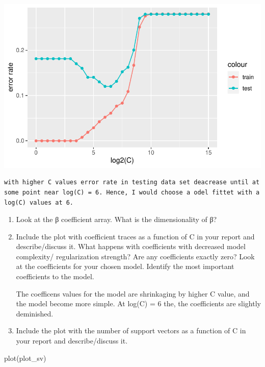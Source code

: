 \documentclass[
  letterpaper,
  DIV=11,
  numbers=noendperiod]{scrartcl}
\newenvironment{Shaded}{\begin{snugshade}}{\end{snugshade}}
\newcommand{\FunctionTok}[1]{\textcolor[rgb]{0.28,0.35,0.67}{#1}}
\newcommand{\NormalTok}[1]{\textcolor[rgb]{0.00,0.23,0.31}{#1}}
\begin{document}
\includegraphics{excercise_doc_files/figure-pdf/unnamed-chunk-28-1.pdf}

\begin{verbatim}
with higher C values error rate in testing data set deacrease until at some point near log(C) = 6. Hence, I would choose a odel fittet with a log(C) values at 6.
\end{verbatim}

\begin{enumerate}
\def\labelenumi{(\alph{enumi})}
\setcounter{enumi}{6}
\item
  Look at the β coefficient array. What is the dimensionality of β?
\item
  Include the plot with coefficient traces as a function of C in your
  report and describe/discuss it. What happens with coefficients with
  decreased model complexity/ regularization strength? Are any
  coefficients exactly zero? Look at the coefficients for your chosen
  model. Identify the most important coefficients to the model.

  The coefficens values for the model are shrinkaging by higher C value,
  and the model become more simple. At log(C) = 6 the, the coefficients
  are slightly deminished.
\item
  Include the plot with the number of support vectors as a function of C
  in your report and describe/discuss it.
\end{enumerate}

\begin{Shaded}
\begin{Highlighting}[]
\FunctionTok{plot}\NormalTok{(plot\_sv)}
\end{Highlighting}
\end{Shaded}
\end{document}
